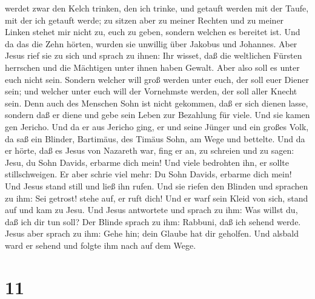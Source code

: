 werdet zwar den Kelch trinken, den ich trinke, und getauft werden mit
der Taufe, mit der ich getauft werde;  zu sitzen aber zu
meiner Rechten und zu meiner Linken stehet mir nicht zu, euch zu geben,
sondern welchen es bereitet ist.  Und da das die Zehn
hörten, wurden sie unwillig über Jakobus und Johannes. 
Aber Jesus rief sie zu sich und sprach zu ihnen: Ihr wisset, daß die
weltlichen Fürsten herrschen und die Mächtigen unter ihnen haben Gewalt.
 Aber also soll es unter euch nicht sein. Sondern welcher
will groß werden unter euch, der soll euer Diener sein; 
und welcher unter euch will der Vornehmste werden, der soll aller Knecht
sein.  Denn auch des Menschen Sohn ist nicht gekommen, daß
er sich dienen lasse, sondern daß er diene und gebe sein Leben zur
Bezahlung für viele.  Und sie kamen gen Jericho. Und da er
aus Jericho ging, er und seine Jünger und ein großes Volk, da saß ein
Blinder, Bartimäus, des Timäus Sohn, am Wege und bettelte. 
Und da er hörte, daß es Jesus von Nazareth war, fing er an, zu schreien
und zu sagen: Jesu, du Sohn Davids, erbarme dich mein!  Und
viele bedrohten ihn, er sollte stillschweigen. Er aber schrie viel mehr:
Du Sohn Davids, erbarme dich mein!  Und Jesus stand still
und ließ ihn rufen. Und sie riefen den Blinden und sprachen zu ihm: Sei
getrost! stehe auf, er ruft dich!  Und er warf sein Kleid
von sich, stand auf und kam zu Jesu.  Und Jesus antwortete
und sprach zu ihm: Was willst du, daß ich dir tun soll? Der Blinde
sprach zu ihm: Rabbuni, daß ich sehend werde.  Jesus aber
sprach zu ihm: Gehe hin; dein Glaube hat dir geholfen. Und alsbald ward
er sehend und folgte ihm nach auf dem Wege.

\hypertarget{section-10}{%
\section{11}\label{section-10}}

